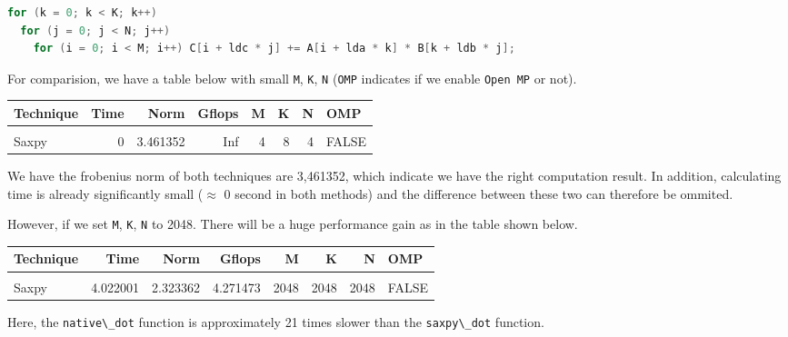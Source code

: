 \documentclass[
  12pt,
  xcolor = usenames,dvipsnames]{article}
\newcommand{\passthrough}[1]{#1}
\begin{document}
\begin{lstlisting}[language=C]
for (k = 0; k < K; k++)
  for (j = 0; j < N; j++)
    for (i = 0; i < M; i++) C[i + ldc * j] += A[i + lda * k] * B[k + ldb * j];
\end{lstlisting}

For comparision, we have a table below with small \passthrough{\lstinline!M!}, \passthrough{\lstinline!K!}, \passthrough{\lstinline!N!} (\passthrough{\lstinline!OMP!} indicates if we enable \passthrough{\lstinline!Open MP!} or not).

\begin{longtable}[t]{lrrrrrrl}
\toprule
Technique & Time & Norm & Gflops & M & K & N & OMP\\
\midrule
\cellcolor{gray!6}{Naive} & \cellcolor{gray!6}{0} & \cellcolor{gray!6}{3.461352} & \cellcolor{gray!6}{Inf} & \cellcolor{gray!6}{4} & \cellcolor{gray!6}{8} & \cellcolor{gray!6}{4} & \cellcolor{gray!6}{FALSE}\\
Saxpy & 0 & 3.461352 & Inf & 4 & 8 & 4 & FALSE\\
\bottomrule
\end{longtable}

We have the frobenius norm of both techniques are 3,461352, which indicate we have the right computation result. In addition, calculating time is already significantly small (\(\approx\) 0 second in both methods) and the difference between these two can therefore be ommited.

However, if we set \passthrough{\lstinline!M!}, \passthrough{\lstinline!K!}, \passthrough{\lstinline!N!} to 2048. There will be a huge performance gain as in the table shown below.

\begin{longtable}[t]{lrrrrrrl}
\toprule
Technique & Time & Norm & Gflops & M & K & N & OMP\\
\midrule
\cellcolor{gray!6}{Naive} & \cellcolor{gray!6}{82.764972} & \cellcolor{gray!6}{2.323362} & \cellcolor{gray!6}{0.207574} & \cellcolor{gray!6}{2048} & \cellcolor{gray!6}{2048} & \cellcolor{gray!6}{2048} & \cellcolor{gray!6}{FALSE}\\
Saxpy & 4.022001 & 2.323362 & 4.271473 & 2048 & 2048 & 2048 & FALSE\\
\bottomrule
\end{longtable}

Here, the \passthrough{\lstinline!native\_dot!} function is approximately 21 times slower than the \passthrough{\lstinline!saxpy\_dot!} function.
\end{document}
